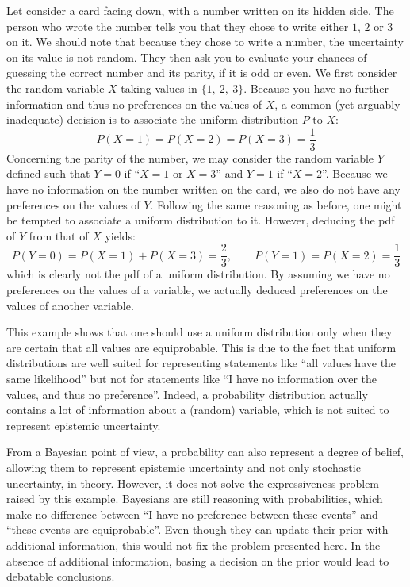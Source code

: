 \begin{example}\label{ex:proba_limitations}
    Let consider a card facing down, with a number written on its hidden side. The person who wrote the number tells you that they chose to write either $1$, $2$ or $3$ on it. We should note that because they chose to write a number, the uncertainty on its value is not random. They then ask you to evaluate your chances of guessing the correct number and its parity, \ie if it is odd or even. We first consider the random variable $X$ taking values in $\{1,~2,~3\}$. Because you have no further information and thus no preferences on the values of $X$, a common (yet arguably inadequate) decision is to associate the uniform distribution $P$ to $X$:
    \begin{equation*}
        P(X=1)=P(X=2)=P(X=3)=\frac{1}{3}
    \end{equation*}
    Concerning the parity of the number, we may consider the random variable $Y$ defined such that $Y=0$ if ``$X=1$ or $X=3$'' and $Y=1$ if ``$X=2$''. Because we have no information on the number written on the card, we also do not have any preferences on the values of $Y$. Following the same reasoning as before, one might be tempted to associate a uniform distribution to it. However, deducing the \acrshort{pdf} of $Y$ from that of $X$ yields:
    \begin{equation*}
        P(Y=0)=P(X=1)+P(X=3)=\frac{2}{3},\qquad P(Y=1)=P(X=2) = \frac{1}{3}
    \end{equation*}
    which is clearly not the \acrshort{pdf} of a uniform distribution. By assuming we have no preferences on the values of a variable, we actually deduced preferences on the values of another variable. 
    
    This example shows that one should use a uniform distribution only when they are certain that all values are equiprobable. This is due to the fact that uniform distributions are well suited for representing statements like ``all values have the same likelihood'' but not for statements like ``I have no information over the values, and thus no preference''. Indeed, a probability distribution actually contains a lot of information about a (random) variable, which is not suited to represent epistemic uncertainty.
    
    \begin{remark}
        From a Bayesian point of view, a probability can also represent a degree of belief, allowing them to represent epistemic uncertainty and not only stochastic uncertainty, in theory. However, it does not solve the expressiveness problem raised by this example. Bayesians are still reasoning with probabilities, which make no difference between ``I have no preference between these events'' and ``these events are equiprobable''. Even though they can update their prior with additional information, this would not fix the problem presented here. In the absence of additional information, basing a decision on the prior would lead to debatable conclusions.
    \end{remark}
\end{example}

